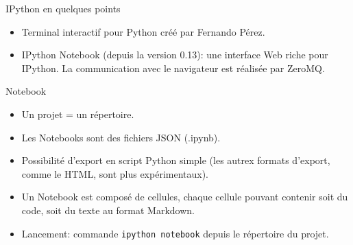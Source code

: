 \documentclass{beamer}
\begin{document}
\begin{frame}{IPython en quelques points}

	\begin{itemize}
		\item Terminal interactif pour Python créé par Fernando Pérez.
		\item IPython Notebook (depuis la version 0.13): une interface Web riche 
			  pour IPython. La communication avec le navigateur est réalisée par
			  ZeroMQ.
	\end{itemize}

\end{frame}


\begin{frame}{Notebook}
	
	\begin{itemize}
		\item Un projet = un répertoire.
		\item Les Notebooks sont des fichiers JSON (.ipynb).
		\item Possibilité d'export en script Python simple (les autrex formats 
			  d'export, comme le HTML, sont plus expérimentaux).
		\item Un Notebook est composé de cellules, chaque cellule pouvant contenir
			  soit du code, soit du texte au format Markdown.
		\item Lancement: commande \texttt{ipython notebook} depuis le répertoire du 
		      projet.
	\end{itemize}
	
\end{frame}
	
\end{document}
